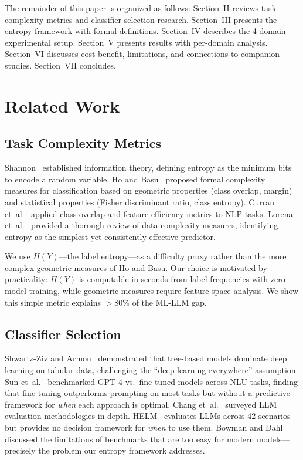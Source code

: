 \documentclass[review,3p]{elsarticle}
\begin{document}
The remainder of this paper is organized as follows: Section~II reviews task complexity metrics and classifier selection research. Section~III presents the entropy framework with formal definitions. Section~IV describes the 4-domain experimental setup. Section~V presents results with per-domain analysis. Section~VI discusses cost-benefit, limitations, and connections to companion studies. Section~VII concludes.

\section{Related Work}

\subsection{Task Complexity Metrics}
Shannon~\cite{shannon1948} established information theory, defining entropy as the minimum bits to encode a random variable. Ho and Basu~\cite{ho2002} proposed formal complexity measures for classification based on geometric properties (class overlap, margin) and statistical properties (Fisher discriminant ratio, class entropy). Curran et~al.~\cite{curran2007} applied class overlap and feature efficiency metrics to NLP tasks. Lorena et~al.~\cite{lorena2019} provided a thorough review of data complexity measures, identifying entropy as the simplest yet consistently effective predictor.

We use $H(Y)$---the label entropy---as a difficulty proxy rather than the more complex geometric measures of Ho and Basu. Our choice is motivated by practicality: $H(Y)$ is computable in seconds from label frequencies with zero model training, while geometric measures require feature-space analysis. We show this simple metric explains $>$80\% of the ML-LLM gap.

\subsection{Classifier Selection}
Shwartz-Ziv and Armon~\cite{shwartz2022} demonstrated that tree-based models dominate deep learning on tabular data, challenging the ``deep learning everywhere'' assumption. Sun et~al.~\cite{sun2023} benchmarked GPT-4 vs.\ fine-tuned models across NLU tasks, finding that fine-tuning outperforms prompting on most tasks but without a predictive framework for \emph{when} each approach is optimal. Chang et~al.~\cite{chang2024} surveyed LLM evaluation methodologies in depth. HELM~\cite{liang2022} evaluates LLMs across 42 scenarios but provides no decision framework for \emph{when} to use them. Bowman and Dahl~\cite{bowman2021} discussed the limitations of benchmarks that are too easy for modern models---precisely the problem our entropy framework addresses.
\end{document}
